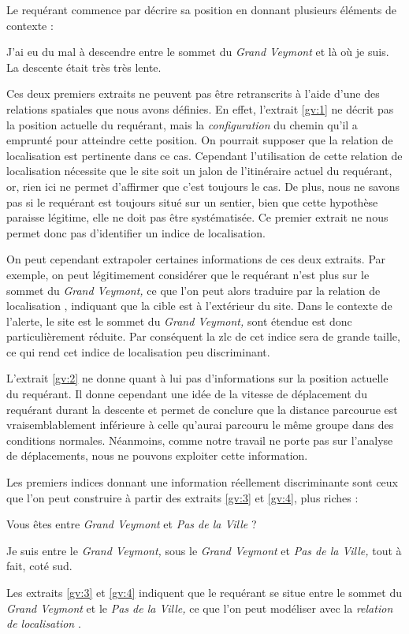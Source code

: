 Le requérant commence par décrire sa position en donnant plusieurs
éléments de contexte :
%
\begin{dialogue}
  \Req {} J'ai eu du mal à descendre entre le sommet du
  \emph{Grand Veymont} et là où je suis.  La descente
  était très très lente.
\end{dialogue}
%
Ces deux premiers extraits ne peuvent pas être retranscrits à l'aide
d'une des relations spatiales que nous avons définies. En effet,
l'extrait \ref{gv:1} ne décrit pas la position actuelle du requérant,
mais la \emph{configuration} du chemin qu'il a emprunté pour atteindre
cette position. On pourrait supposer que la relation de localisation
 est pertinente dans ce
cas. Cependant l'utilisation de cette relation de localisation
nécessite que le site soit un jalon de l’itinéraire actuel du
requérant, or, rien ici ne permet d'affirmer que c'est toujours le
cas. De plus, nous ne savons pas si le requérant est toujours situé
sur un sentier, bien que cette hypothèse paraisse légitime, elle ne
doit pas être systématisée. Ce premier extrait ne nous permet donc pas
d'identifier un indice de localisation.

On peut cependant extrapoler certaines informations de ces deux
extraits. Par exemple, on peut légitimement considérer que le
requérant n'est plus sur le sommet du \emph{Grand Veymont,} ce que
l'on peut alors traduire par la relation de localisation
, indiquant que la cible est à
l'extérieur du site. Dans le contexte de l'alerte, le site est le
sommet du \emph{Grand Veymont,} sont étendue est donc particulièrement
réduite. Par conséquent la \ac{zlc} de cet indice sera de grande
taille, ce qui rend cet indice de localisation peu discriminant.

L'extrait \ref{gv:2} ne donne quant à lui pas d'informations sur la
position actuelle du requérant. Il donne cependant une idée de la
vitesse de déplacement du requérant durant la descente et permet de
conclure que la distance parcourue est vraisemblablement inférieure à
celle qu'aurai parcouru le même groupe dans des conditions
normales. Néanmoins, comme notre travail ne porte pas sur l'analyse de
déplacements, nous ne pouvons exploiter cette information.

Les premiers indices donnant une information réellement discriminante
sont ceux que l'on peut construire à partir des extraits \ref{gv:3} et
\ref{gv:4}, plus riches :
%
\begin{dialogue}
  \Sec {} Vous êtes entre \emph{Grand Veymont} et
  \emph{Pas de la Ville} ?

  \Req {} Je suis entre le \emph{Grand Veymont,}
   sous le \emph{Grand Veymont} et \emph{Pas de la
    Ville,} tout à fait,  coté sud.
\end{dialogue}
% 
Les extraits \ref{gv:3} et \ref{gv:4} indiquent que le requérant se
situe entre le sommet du \emph{Grand Veymont} et le \emph{Pas de la
  Ville,} ce que l'on peut modéliser avec la \emph{relation de
  localisation} .

